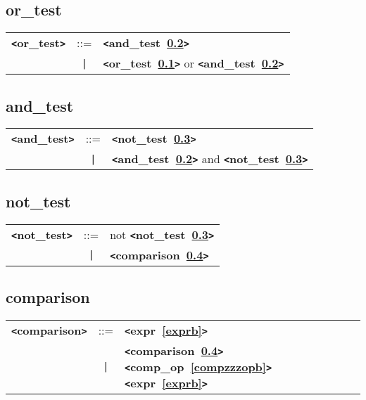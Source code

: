 \documentclass[12pt]{article}
\begin{document}
\subsection{or\_test}
\label{orzzztestb}
\begin{tabular}{lcl}
{\bf \verb+<+or\_test\verb+>+} & ::=  & {\bf \verb+<+and\_test~\ref{andzzztestb}\verb+>+}  \\
 & \verb+|+  & {\bf \verb+<+or\_test~\ref{orzzztestb}\verb+>+}  or {\bf \verb+<+and\_test~\ref{andzzztestb}\verb+>+}  \\
\end{tabular}

\subsection{and\_test}
\label{andzzztestb}
\begin{tabular}{lcl}
{\bf \verb+<+and\_test\verb+>+} & ::=  & {\bf \verb+<+not\_test~\ref{notzzztestb}\verb+>+}  \\
 & \verb+|+  & {\bf \verb+<+and\_test~\ref{andzzztestb}\verb+>+}  and {\bf \verb+<+not\_test~\ref{notzzztestb}\verb+>+}  \\
\end{tabular}

\subsection{not\_test}
\label{notzzztestb}
\begin{tabular}{lcl}
{\bf \verb+<+not\_test\verb+>+} & ::=  & not {\bf \verb+<+not\_test~\ref{notzzztestb}\verb+>+}  \\
 & \verb+|+  & {\bf \verb+<+comparison~\ref{comparisonb}\verb+>+}  \\
\end{tabular}

\subsection{comparison}
\label{comparisonb}
\begin{tabular}{lcl}
{\bf \verb+<+comparison\verb+>+} & ::=  & {\bf \verb+<+expr~\ref{exprb}\verb+>+}  \\
 & \verb+|+  & {\bf \verb+<+comparison~\ref{comparisonb}\verb+>+}  {\bf \verb+<+comp\_op~\ref{compzzzopb}\verb+>+}  {\bf \verb+<+expr~\ref{exprb}\verb+>+}  \\
\end{tabular}
\end{document}
